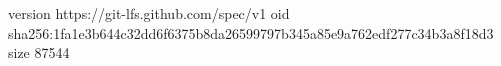 version https://git-lfs.github.com/spec/v1
oid sha256:1fa1e3b644c32dd6f6375b8da26599797b345a85e9a762edf277c34b3a8f18d3
size 87544
